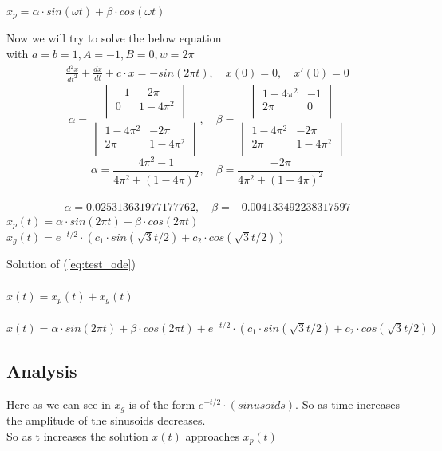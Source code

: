 \documentclass{article}
\begin{document}
\begin{enumerate}
\begin{itemize}
        $x_p = \alpha \cdot sin(\omega t) + \beta \cdot cos(\omega t)$
        
    \end{itemize}
    
    Now we will try to solve the below equation\\
    with $a = b = 1, A = -1, B = 0, w = 2\pi$\\
    \begin{align}
        \frac{d^2x}{dt^2}+\frac{dx}{dt}+c\cdot x = -sin(2 \pi t), \quad \label{eq:test_ode}
        x(0) = 0,\quad x'(0) = 0
    \end{align}
    $$\alpha = \frac{
        \begin{vmatrix}
    -1 & -2\pi \\
    0 & 1 - 4\pi^2 \\
    \end{vmatrix}}{
        \begin{vmatrix}
        1 - 4\pi^2 & -2\pi \\
        2\pi & 1-4\pi^2 \\
         \end{vmatrix}
    }, \quad \beta = \frac{
        \begin{vmatrix}
        1-4\pi^2 & -1 \\
        2\pi & 0 \\
        \end{vmatrix}
    }
    {
        \begin{vmatrix}
        1 - 4\pi^2 & -2\pi \\
        2\pi & 1-4\pi^2 \\
         \end{vmatrix}
    }$$
    $$\alpha = \frac{4\pi^2-1}{4\pi^2 + (1-4\pi)^2}, \quad \beta = \frac{-2\pi}{4\pi^2 + (1-4\pi)^2}$$\\
    $$\alpha = 0.025313631977177762, \quad \beta = -0.004133492238317597$$
    $x_p(t) = \alpha \cdot sin(2\pi t) + \beta \cdot cos(2\pi t)$\\
    $x_g(t) = e^{-t/2} \cdot (c_1 \cdot sin(\sqrt{3}t/2) + c_2 \cdot cos(\sqrt{3}t/2))$
    
    Solution of (\ref{eq:test_ode})\\\\
    $x(t) = x_p(t) + x_g(t)$\\\\
    $x(t) = \alpha \cdot sin(2\pi t) + \beta \cdot cos(2\pi t) + e^{-t/2} \cdot (c_1 \cdot sin(\sqrt{3}t/2) + c_2 \cdot cos(\sqrt{3}t/2))$
    \subsection*{Analysis}
    Here as we can see in $x_g$ is of the form  $e^{-t/2} \cdot (sinusoids).$ So as time increases the amplitude of the sinusoids decreases.\\
    So as t increases the solution $x(t)$ approaches $x_p(t)$\\



\end{enumerate}
\end{document}
